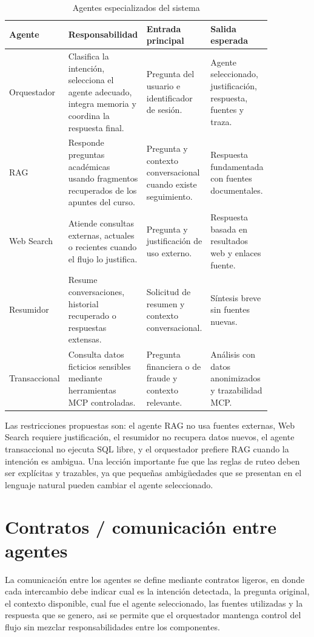 \documentclass[conference]{IEEEtran}
\begin{document}
\begin{table}[!t]
\caption{Agentes especializados del sistema}
\label{tab:agentes}
\centering
\begin{tabular}{p{0.15\linewidth} p{0.31\linewidth} p{0.23\linewidth} p{0.17\linewidth}}
\hline
\textbf{Agente} & \textbf{Responsabilidad} & \textbf{Entrada principal} & \textbf{Salida esperada} \\
\hline
Orquestador & Clasifica la intención, selecciona el agente adecuado, integra memoria y coordina la respuesta final. & Pregunta del usuario e identificador de sesión. & Agente seleccionado, justificación, respuesta, fuentes y traza. \\
RAG & Responde preguntas académicas usando fragmentos recuperados de los apuntes del curso. & Pregunta y contexto conversacional cuando existe seguimiento. & Respuesta fundamentada con fuentes documentales. \\
Web Search & Atiende consultas externas, actuales o recientes cuando el flujo lo justifica. & Pregunta y justificación de uso externo. & Respuesta basada en resultados web y enlaces fuente. \\
Resumidor & Resume conversaciones, historial recuperado o respuestas extensas. & Solicitud de resumen y contexto conversacional. & Síntesis breve sin fuentes nuevas. \\
Transaccional & Consulta datos ficticios sensibles mediante herramientas MCP controladas. & Pregunta financiera o de fraude y contexto relevante. & Análisis con datos anonimizados y trazabilidad MCP. \\
\hline
\end{tabular}
\end{table}

Las restricciones propuestas son: el agente RAG no usa fuentes externas, Web Search requiere justificación, el resumidor no recupera datos nuevos, el agente transaccional no ejecuta SQL libre, y el orquestador prefiere RAG cuando la intención es ambigua. Una lección importante fue que las reglas de ruteo deben ser explícitas y trazables, ya que pequeñas ambigüedades que se presentan en el lenguaje natural pueden cambiar el agente seleccionado.
\section{Contratos / comunicación entre agentes}

La comunicación entre los agentes se define mediante contratos ligeros, en donde cada intercambio debe indicar cual es la intención detectada, la pregunta original, el contexto disponible, cual fue el agente seleccionado, las fuentes utilizadas y la respuesta que se genero, asi se permite que el orquestador mantenga control del flujo sin mezclar responsabilidades entre los componentes.
\end{document}
